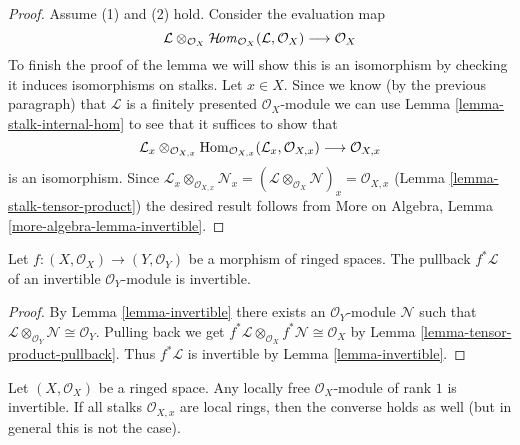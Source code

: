 \begin{proof}
\medskip\noindent
Assume (1) and (2) hold. Consider the evaluation map
$$
\mathcal{L} \otimes_{\mathcal{O}_X}
\mathop{\mathcal{H}\!\mathit{om}}\nolimits_{\mathcal{O}_X}(\mathcal{L}, \mathcal{O}_X)
\longrightarrow \mathcal{O}_X
$$
To finish the proof of the lemma
we will show this is an isomorphism by checking it induces
isomorphisms on stalks. Let $x \in X$.
Since we know (by the previous paragraph)
that $\mathcal{L}$ is a finitely presented
$\mathcal{O}_X$-module
we can use Lemma \ref{lemma-stalk-internal-hom}
to see that it suffices to show that
$$
\mathcal{L}_x \otimes_{\mathcal{O}_{X, x}}
\mathop{\mathrm{Hom}}\nolimits_{\mathcal{O}_{X, x}}(\mathcal{L}_x, \mathcal{O}_{X, x})
\longrightarrow \mathcal{O}_{X, x}
$$
is an isomorphism. Since
$\mathcal{L}_x \otimes_{\mathcal{O}_{X, x}} \mathcal{N}_x =
(\mathcal{L} \otimes_{\mathcal{O}_X} \mathcal{N})_x =
\mathcal{O}_{X, x}$ (Lemma \ref{lemma-stalk-tensor-product})
the desired result follows from
More on Algebra, Lemma \ref{more-algebra-lemma-invertible}.
\end{proof}

\begin{lemma}
\label{lemma-pullback-invertible}
Let $f : (X, \mathcal{O}_X) \to (Y, \mathcal{O}_Y)$ be a
morphism of ringed spaces. The pullback $f^*\mathcal{L}$ of an
invertible $\mathcal{O}_Y$-module is invertible.
\end{lemma}

\begin{proof}
By Lemma \ref{lemma-invertible}
there exists an $\mathcal{O}_Y$-module $\mathcal{N}$ such that
$\mathcal{L} \otimes_{\mathcal{O}_Y} \mathcal{N} \cong \mathcal{O}_Y$.
Pulling back we get
$f^*\mathcal{L} \otimes_{\mathcal{O}_X} f^*\mathcal{N} \cong \mathcal{O}_X$
by Lemma \ref{lemma-tensor-product-pullback}.
Thus $f^*\mathcal{L}$ is invertible by Lemma \ref{lemma-invertible}.
\end{proof}

\begin{lemma}
\label{lemma-invertible-is-locally-free-rank-1}
Let $(X, \mathcal{O}_X)$ be a ringed space. Any locally free
$\mathcal{O}_X$-module of rank $1$ is invertible.
If all stalks $\mathcal{O}_{X, x}$ are local rings, then
the converse holds as well (but in general this is not the case).
\end{lemma}

